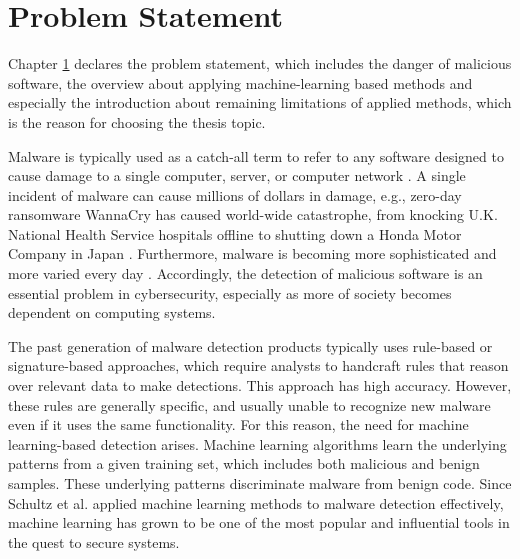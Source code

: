 
\chapter{Problem Statement}
\label{chap:problem-statement}
\graphicspath{{Chapter1/Figs/}}

\begin{chapabstract}
Chapter \ref{chap:problem-statement} declares the problem statement, which includes the danger of malicious software, the overview about applying machine-learning based methods and especially the introduction about remaining limitations of applied methods, which is the reason for choosing the thesis topic.
\end{chapabstract}
 
 Malware is typically used as a catch-all term to refer to any software designed to cause damage to a single computer, server, or computer network \cite{moir2003defining}.
 A single incident of malware can cause millions of dollars in damage, e.g., zero-day ransomware WannaCry has caused world-wide catastrophe, from knocking U.K. National Health Service hospitals offline to shutting down a Honda Motor Company in Japan \cite{chen2017automated}.
 Furthermore, malware is becoming more sophisticated and more varied every day  \cite{shahi2009technology}.
Accordingly, the detection of malicious software is an essential problem in cybersecurity, especially as more of society becomes dependent on computing systems.

The past generation of malware detection products typically uses rule-based or signature-based approaches, which require analysts to handcraft rules that reason over relevant data to make detections. 
This approach has high accuracy. 
However, these rules are generally specific, and usually unable to recognize new malware even if it uses the same functionality. 
For this reason, the need for machine learning-based detection arises. 
Machine learning algorithms learn the underlying patterns from a given training set, which includes both malicious and benign samples. 
These underlying patterns discriminate malware from benign code. 
Since Schultz et al. \cite{schultz2001data} applied machine learning methods to malware detection effectively, machine learning has grown to be one of the most popular and influential tools in the quest to secure systems. 

